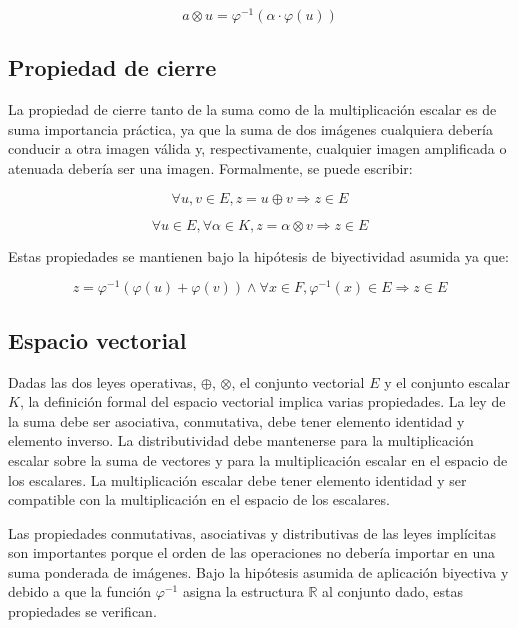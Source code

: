 \begin{equation}	
	a \otimes u = \varphi^{-1}(\alpha\cdot\varphi(u))
\end{equation} 

\subsection{Propiedad de cierre}

La propiedad de cierre tanto de la suma como de la multiplicación escalar es de suma importancia práctica, ya que la suma de dos imágenes cualquiera debería conducir a otra imagen válida y, respectivamente, cualquier imagen amplificada o atenuada debería ser una imagen. Formalmente, se puede escribir:

\begin{equation}
	\forall u,v \in E, z = u \oplus v \Rightarrow z \in E
\end{equation}

\begin{equation}
	\forall u \in E, \forall \alpha \in K, z=\alpha \otimes v \Rightarrow z \in E
\end{equation}

Estas propiedades se mantienen bajo la hipótesis de biyectividad asumida ya que: 

\begin{equation}
	z=\varphi^{-1}(\varphi(u)+\varphi(v)) \land \forall x \in F, \varphi^{-1}(x) \in E \Rightarrow z \in E
\end{equation}

\subsection{Espacio vectorial}
Dadas las dos leyes operativas, $\oplus$, $\otimes$, el conjunto vectorial $E$ y el conjunto escalar $K$, la definición formal del espacio vectorial implica varias propiedades. La ley de la suma debe ser asociativa, conmutativa, debe tener elemento identidad y elemento inverso. La distributividad debe mantenerse para la multiplicación escalar sobre la suma de vectores y para la multiplicación escalar en el espacio de los escalares. La multiplicación escalar debe tener elemento identidad y ser compatible con la multiplicación en el espacio de los escalares.

Las propiedades conmutativas, asociativas y distributivas de las leyes implícitas son importantes porque el orden de las operaciones no debería importar en una suma ponderada de imágenes. Bajo la hipótesis asumida de aplicación biyectiva y debido a que la función $\varphi^{-1}$ asigna la estructura $\mathbb{R}$ al conjunto dado, estas propiedades se verifican.

